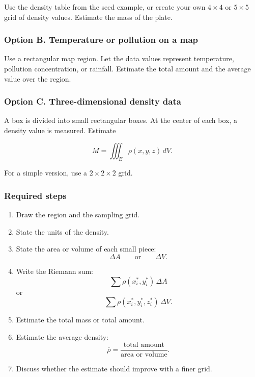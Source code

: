 Use the density table from the seed example, or create your own \(4\times4\) or
\(5\times5\) grid of density values.  Estimate the mass of the plate.

\subsubsection*{Option B. Temperature or pollution on a map}

Use a rectangular map region.  Let the data values represent temperature, pollution
concentration, or rainfall.  Estimate the total amount and the average value over the
region.

\subsubsection*{Option C. Three-dimensional density data}

A box is divided into small rectangular boxes.  At the center of each box, a density
value is measured.  Estimate

\[
    M=\iiint_E \rho(x,y,z)\,dV.
\]

For a simple version, use a \(2\times2\times2\) grid.

\subsubsection*{Required steps}

\begin{enumerate}
\item Draw the region and the sampling grid.

\item State the units of the density.

\item State the area or volume of each small piece:
\[
    \Delta A
    \qquad\text{or}\qquad
    \Delta V.
\]

\item Write the Riemann sum:
\[
    \sum \rho(x_i^*,y_i^*)\,\Delta A
\]
or
\[
    \sum \rho(x_i^*,y_i^*,z_i^*)\,\Delta V.
\]

\item Estimate the total mass or total amount.

\item Estimate the average density:
\[
    \overline{\rho}
    =
    \frac{\text{total amount}}{\text{area or volume}}.
\]

\item Discuss whether the estimate should improve with a finer grid.
\end{enumerate}

